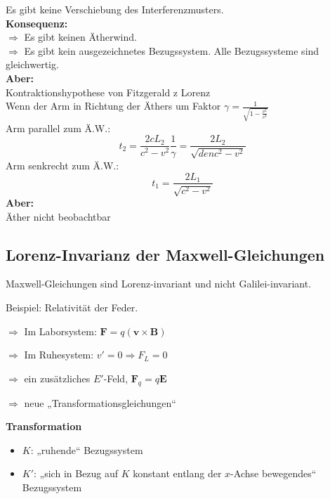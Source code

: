 \documentclass[titlepage,11pt,a4paper,ngerman]{report}
\renewcommand{\vec}[1]{\boldsymbol{#1}}
\begin{document}
Es gibt keine Verschiebung des Interferenzmusters.\\[5pt]
\textbf{Konsequenz:}\\
$ \Rightarrow $ Es gibt keinen Ätherwind.\\
$ \Rightarrow $ Es gibt kein ausgezeichnetes Bezugssystem. Alle Bezugssysteme sind gleichwertig.\\[5pt]
\textbf{Aber:}\\
Kontraktionshypothese von Fitzgerald z Lorenz\\
Wenn der Arm in Richtung der Äthers um Faktor $ \gamma = \frac{1}{\sqrt{1 - \frac{v^2}{c^2}}} $ \\
Arm parallel zum Ä.W.:
\begin{equation*}
t_2 = \frac{2cL_2}{c^2 - v^2} \frac{1}{\gamma} = \frac{2 L_2}{\sqrt{denc^2 - v^2}}
\end{equation*}
Arm senkrecht zum Ä.W.:
\begin{equation*}
t_1 = \frac{2L_1}{\sqrt{c^2 - v^2}}
\end{equation*}
\textbf{Aber:}\\
Äther nicht beobachtbar

\subsection{Lorenz-Invarianz der Maxwell-Gleichungen}

Maxwell-Gleichungen sind Lorenz-invariant und nicht Galilei-invariant.

Beispiel: Relativität der Feder. 







$\Rightarrow$ Im Laborsystem: $\vec{F}=q(\vec{v}\times\vec{B})$

$\Rightarrow$ Im Ruhesystem: $v'=0\Rightarrow F_L=0$ \begin{LARGE}\lightning\end{LARGE}

$\Rightarrow$ ein zusätzliches $E'$-Feld, $\vec{F}_q=q\vec{E}$

$\Rightarrow$ neue „Transformationsgleichungen“

\textbf{Transformation}
\begin{itemize}
	\item $K$: „ruhende“ Bezugssystem
	\item $K'$: „sich in Bezug auf $K$ konstant entlang der $x$-Achse bewegendes“ Bezugssystem
\end{itemize}
\end{document}
